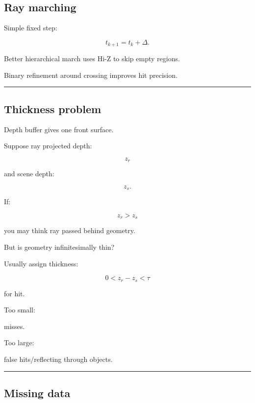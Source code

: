 \subsection{Ray marching}\label{04-visual-computing-ii-ch040-ray-marching}

\hypertarget{04-visual-computing-ii-ch040-ray-marching}{}

Simple fixed step:

\[
t_{k+1}=t_k+\Delta.
\]

Better hierarchical march uses Hi-Z to skip empty regions.

Binary refinement around crossing improves hit precision.

\begin{center}\rule{0.5\linewidth}{0.5pt}\end{center}

\subsection{Thickness problem}\label{04-visual-computing-ii-ch040-thickness-problem}

\hypertarget{04-visual-computing-ii-ch040-thickness-problem}{}

Depth buffer gives one front surface.

Suppose ray projected depth:

\[
z_r
\]

and scene depth:

\[
z_s.
\]

If:

\[
z_r>z_s
\]

you may think ray passed behind geometry.

But is geometry infinitesimally thin?

Usually assign thickness:

\[
0<
z_r-z_s
<
\tau
\]

for hit.

Too small:

misses.

Too large:

false hits/reflecting through objects.

\begin{center}\rule{0.5\linewidth}{0.5pt}\end{center}

\subsection{Missing data}\label{04-visual-computing-ii-ch040-missing-data}


